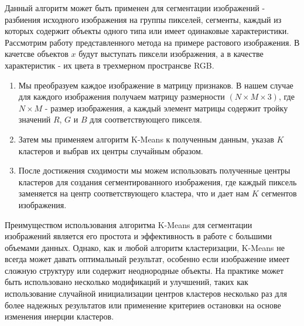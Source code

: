 \documentclass{article}
\begin{document}
Данный алгоритм может быть применен для сегментации изображений - разбиения исходного изображения на группы пикселей, сегменты, каждый из которых содержит объекты одного типа или имеет одинаковые характеристики.
Рассмотрим работу представленного метода на примере растового изображения. В качетсве объектов $x$ будут выступать пиксели изображения, а в качестве характеристик - их цвета в трехмерном пространсве RGB. 

\begin{enumerate}
\item Мы преобразуем каждое изображение в матрицу признаков. В нашем случае для каждого изображения получаем матрицу размерности $(N \times M \times 3)$, где $N\times M$ - размер изображения, а каждый элемент матрицы содержит тройку значений $R$, $G$ и $B$ для соответствующего пикселя.
\item Затем мы применяем алгоритм K-Means к полученным данным, указав $K$ кластеров и выбрав их центры случайным образом.
\item После достижения сходимости мы можем использовать полученные центры кластеров для создания сегментированного изображения, где каждый пиксель заменяется на центр соответствующего кластера, что и дает нам $K$ сегментов изображения.
\end{enumerate}

Преимуществом использования алгоритма K-Means для сегментации изображений является его простота и эффективность в работе с большими объемами данных. Однако, как и любой алгоритм кластеризации, K-Means не всегда может давать оптимальный результат, особенно если изображение имеет сложную структуру или содержит неоднородные объекты. На практике может быть использовано несколько модификаций и улучшений, таких как использование случайной инициализации центров кластеров несколько раз для более надежных результатов или применение критериев остановки на основе изменения инерции кластеров.
\end{document}

